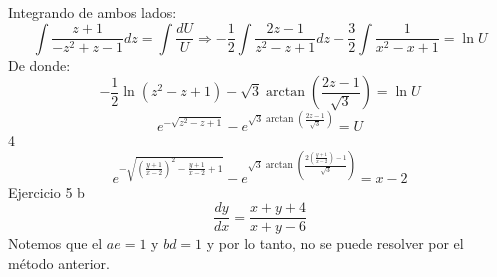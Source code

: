 Integrando de ambos lados:
$$
\int \frac{z+1}{-z^{2}+z-1} d z=\int \frac{d U}{U} \Rightarrow-\frac{1}{2} \int \frac{2 z-1}{z^{2}-z+1} d z-\frac{3}{2} \int \frac{1}{x^{2}-x+1}=\ln U
$$
De donde:
$$
-\frac{1}{2} \ln \left(z^{2}-z+1\right)-\sqrt{3} \arctan \left(\frac{2 z-1}{\sqrt{3}}\right)=\ln U
$$
$$
e^{-\sqrt{z^{2}-z+1}}-e^{\sqrt{3} \arctan \left(\frac{2 z-1}{\sqrt{3}}\right)}=U
$$
4
$$
e^{-\sqrt{\left(\frac{y+1}{x-2}\right)^{2}-\frac{y+1}{x-2}+1}}-e^{\sqrt{3} \arctan \left(\frac{2\left(\frac{y+1}{x-2}\right)-1}{\sqrt{3}}\right)}=x-2
$$
Ejercicio 5 b
$$
\frac{d y}{d x}=\frac{x+y+4}{x+y-6}
$$
Notemos que el $a e=1$ y $b d=1$ y por lo tanto, no se puede resolver por el método anterior.